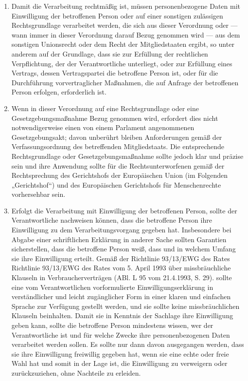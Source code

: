 \begin{enumerate}

   \item Damit die Verarbeitung rechtmäßig ist, müssen personenbezogene Daten mit Einwilligung der betroffenen Person
    oder auf einer sonstigen zulässigen Rechtsgrundlage verarbeitet werden, die sich aus dieser Verordnung oder — wann
    immer in dieser Verordnung darauf Bezug genommen wird — aus dem sonstigen Unionsrecht oder dem Recht der
    Mitgliedstaaten ergibt, so unter anderem auf der Grundlage, dass sie zur Erfüllung der rechtlichen Verpflichtung,
    der der Verantwortliche unterliegt, oder zur Erfüllung eines Vertrags, dessen Vertragspartei die betroffene Person
    ist, oder für die Durchführung vorvertraglicher Maßnahmen, die auf Anfrage der betroffenen Person erfolgen,
    erforderlich ist.%
   \label{itm:eg-40}
   

   \item Wenn in dieser Verordnung auf eine Rechtsgrundlage oder eine Gesetzgebungsmaßnahme Bezug genommen wird,
    erfordert dies nicht notwendigerweise einen von einem Parlament angenommenen Gesetzgebungsakt; davon unberührt
    bleiben Anforderungen gemäß der Verfassungsordnung des betreffenden Mitgliedstaats. Die entsprechende
    Rechtsgrundlage oder Gesetzgebungsmaßnahme sollte jedoch klar und präzise sein und ihre Anwendung sollte für die
    Rechtsunterworfenen gemäß der Rechtsprechung des Gerichtshofs der Europäischen Union (im Folgenden „Gerichtshof“)
    und des Europäischen Gerichtshofs für Menschenrechte vorhersehbar sein.%
   \label{itm:eg-41}
   

   \item Erfolgt die Verarbeitung mit Einwilligung der betroffenen Person, sollte der Verantwortliche nachweisen können,
    dass die betroffene Person ihre Einwilligung zu dem Verarbeitungsvorgang gegeben hat. Insbesondere bei Abgabe einer
    schriftlichen Erklärung in anderer Sache sollten Garantien sicherstellen, dass die betroffene Person weiß, dass und
    in welchem Umfang sie ihre Einwilligung erteilt. Gemäß der Richtlinie 93/13/EWG des Rates\comment
    {Richtlinie 93/13/EWG des Rates vom 5. April 1993 über missbräuchliche Klauseln in Verbraucherverträgen (ABl. L 95
    vom 21.4.1993, S. 29).} sollte eine vom Verantwortlichen vorformulierte Einwilligungserklärung in verständlicher
    und leicht zugänglicher Form in einer klaren und einfachen Sprache zur Verfügung gestellt werden, und sie sollte
    keine missbräuchlichen Klauseln beinhalten. Damit sie in Kenntnis der Sachlage ihre Einwilligung geben kann, sollte
    die betroffene Person mindestens wissen, wer der Verantwortliche ist und für welche Zwecke ihre personenbezogenen
    Daten verarbeitet werden sollen. Es sollte nur dann davon ausgegangen werden, dass sie ihre Einwilligung freiwillig
    gegeben hat, wenn sie eine echte oder freie Wahl hat und somit in der Lage ist, die Einwilligung zu verweigern oder
    zurückzuziehen, ohne Nachteile zu erleiden.%
   \label{itm:eg-42}
   

\end{enumerate}
